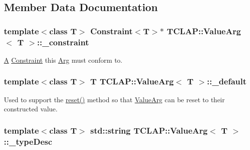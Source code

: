 \subsection{Member Data Documentation}
\hypertarget{class_t_c_l_a_p_1_1_value_arg_aa383908cff37688cf7493d46c840d03b}{
\subsubsection[{\+\_\+constraint}]{\setlength{\rightskip}{0pt plus 5cm}template$<$class T$>$ {\bf Constraint}$<$T$>$$\ast$ {\bf T\+C\+L\+A\+P\+::\+Value\+Arg}$<$ T $>$\+::\+\_\+constraint\hspace{0.3cm}{\ttfamily [protected]}}}\label{class_t_c_l_a_p_1_1_value_arg_aa383908cff37688cf7493d46c840d03b}
\hyperlink{class_a}{A} \hyperlink{class_t_c_l_a_p_1_1_constraint}{Constraint} this \hyperlink{class_t_c_l_a_p_1_1_arg}{Arg} must conform to. \hypertarget{class_t_c_l_a_p_1_1_value_arg_a118e3a7932700a8e3626d8f9ee2e0c95}{
\subsubsection[{\+\_\+default}]{\setlength{\rightskip}{0pt plus 5cm}template$<$class T$>$ T {\bf T\+C\+L\+A\+P\+::\+Value\+Arg}$<$ T $>$\+::\+\_\+default\hspace{0.3cm}{\ttfamily [protected]}}}\label{class_t_c_l_a_p_1_1_value_arg_a118e3a7932700a8e3626d8f9ee2e0c95}
Used to support the \hyperlink{class_t_c_l_a_p_1_1_value_arg_a1bc480b71c4d8ac3646e796af8fb6e14}{reset()} method so that \hyperlink{class_t_c_l_a_p_1_1_value_arg}{Value\+Arg} can be reset to their constructed value. \hypertarget{class_t_c_l_a_p_1_1_value_arg_a78c5e5b67ce4bcebb57c886d9aa49259}{
\subsubsection[{\+\_\+type\+Desc}]{\setlength{\rightskip}{0pt plus 5cm}template$<$class T$>$ std\+::string {\bf T\+C\+L\+A\+P\+::\+Value\+Arg}$<$ T $>$\+::\+\_\+type\+Desc\hspace{0.3cm}{\ttfamily [protected]}}}\label{class_t_c_l_a_p_1_1_value_arg_a78c5e5b67ce4bcebb57c886d9aa49259}
